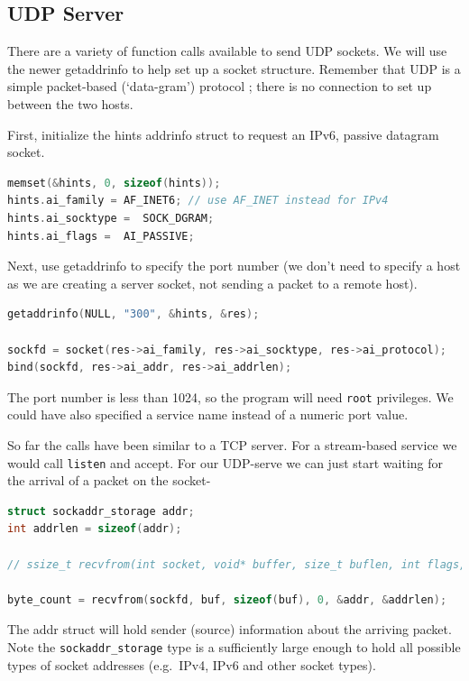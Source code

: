 \subsection{UDP Server}\label{how-do-i-create-a-udp-server}

There are a variety of function calls available to send UDP sockets. We will use the newer getaddrinfo to help set up a socket structure. Remember that UDP is a simple packet-based (`data-gram') protocol ; there is no connection to set up between the two hosts.

First, initialize the hints addrinfo struct to request an IPv6, passive datagram socket.

\begin{lstlisting}[language=C]
memset(&hints, 0, sizeof(hints));
hints.ai_family = AF_INET6; // use AF_INET instead for IPv4
hints.ai_socktype =  SOCK_DGRAM;
hints.ai_flags =  AI_PASSIVE;
\end{lstlisting}

Next, use getaddrinfo to specify the port number (we don't need to specify a host as we are creating a server socket, not sending a packet to a remote host).

\begin{lstlisting}[language=C]
getaddrinfo(NULL, "300", &hints, &res);

sockfd = socket(res->ai_family, res->ai_socktype, res->ai_protocol);
bind(sockfd, res->ai_addr, res->ai_addrlen);
\end{lstlisting}

The port number is less than 1024, so the program will need \texttt{root} privileges. We could have also specified a service name instead of a numeric port value.

So far the calls have been similar to a TCP server. For a stream-based service we would call \texttt{listen} and accept. For our UDP-serve we can just start waiting for the arrival of a packet on the socket-

\begin{lstlisting}[language=C]
struct sockaddr_storage addr;
int addrlen = sizeof(addr);

// ssize_t recvfrom(int socket, void* buffer, size_t buflen, int flags, struct sockaddr *addr, socklen_t * address_len);

byte_count = recvfrom(sockfd, buf, sizeof(buf), 0, &addr, &addrlen);
\end{lstlisting}

The addr struct will hold sender (source) information about the arriving packet. Note the \texttt{sockaddr\_storage} type is a sufficiently large enough to hold all possible types of socket addresses (e.g.~IPv4, IPv6 and other socket types).

